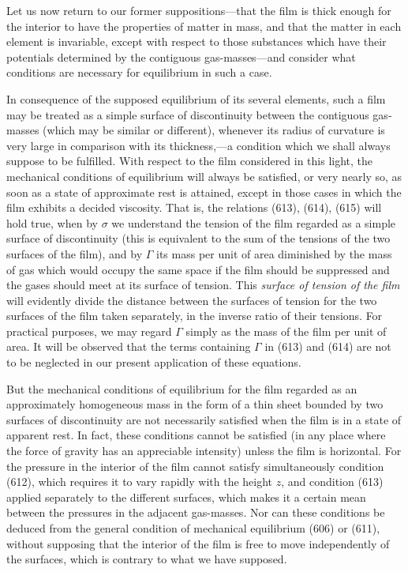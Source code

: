 \documentclass[12pt]{memoir}
\begin{document}
Let us now return to our former suppositions---that the film is thick enough for the interior to have the properties of matter in mass, and that the matter in each element is invariable, except with respect to those substances which have their potentials determined by the contiguous gas-masses---and consider what conditions are necessary for equilibrium in such a case.

In consequence of the supposed equilibrium of its several elements, such a film may be treated as a simple surface of discontinuity between the contiguous gas-masses (which may be similar or different), whenever its radius of curvature is very large in comparison with its thickness,---a condition which we shall always suppose to be fulfilled. With respect to the film considered in this light, the mechanical conditions of equilibrium will always be satisfied, or very nearly so, as soon as a state of approximate rest is attained, except in those cases in which the film exhibits a decided viscosity. That is, the relations (613), (614), (615) will hold true, when by $\sigma$ we understand the tension of the film regarded as a simple surface of discontinuity (this is equivalent to the sum of the tensions of the two surfaces of the film), and by $\Gamma$ its mass per unit of area diminished by the mass of gas which would occupy the same space if the film should be suppressed and the gases should meet at its surface of tension. This \textit{surface of tension of the film} will evidently divide the distance between the surfaces of tension for the two surfaces of the film taken separately, in the inverse ratio of their tensions. For practical purposes, we may regard $\Gamma$ simply as the mass of the film per unit of area. It will be observed that the terms containing $\Gamma$ in (613) and (614) are not to be neglected in our present application of these equations.

But the mechanical conditions of equilibrium for the film regarded as an approximately homogeneous mass in the form of a thin sheet bounded by two surfaces of discontinuity are not necessarily satisfied when the film is in a state of apparent rest. In fact, these conditions cannot be satisfied (in any place where the force of gravity has an appreciable intensity) unless the film is horizontal. For the pressure in the interior of the film cannot satisfy simultaneously condition (612), which requires it to vary rapidly with the height $z$, and condition (613) applied separately to the different surfaces, which makes it a certain mean between the pressures in the adjacent gas-masses. Nor can these conditions be deduced from the general condition of mechanical equilibrium (606) or (611), without supposing that the interior of the film is free to move independently of the surfaces, which is contrary to what we have supposed.
\end{document}
